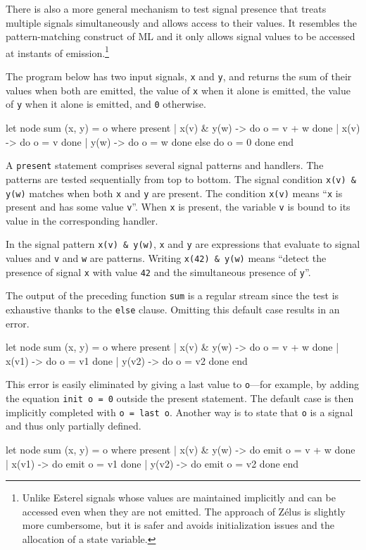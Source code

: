 \documentclass[11pt,titlepage,twoside]{report}
\makeatletter
\newcommand{\zls}[1]{{\@span{class="zelusinline"}#1}}
\newcommand{\zls}[1]{\texttt{#1}}
\renewcommand{\zls}[1]{\texttt{#1}}
\newcommand{\zelus}{{\sf Z\'elus}}
\newcommand{\esterel}{{\sf Esterel}}
\makeatother
\begin{document}
There is also a more general mechanism to test signal presence that treats 
multiple signals simultaneously and allows access to their values.
It resembles the pattern-matching construct of ML and it only allows signal 
values to be accessed at instants of emission.\footnote{Unlike \esterel{} 
signals whose values are maintained implicitly and can be accessed even when 
they are not emitted.
The approach of \zelus{} is slightly more cumbersome, but it is safer and 
avoids initialization issues and the allocation of a state variable.}

The program below has two input signals, \zls{x} and \zls{y}, and
returns the sum of their values when both are emitted, the value of \zls{x} 
when it alone is emitted, the value of \zls{y} when it alone is emitted, and 
\zls{0} otherwise.
\begin{chklisting}[withresult]
let node sum (x, y) = o where
  present
  | x(v) & y(w) -> do o = v + w done
  | x(v) -> do o = v done
  | y(w) -> do o = w done
  else do o = 0 done
  end
\end{chklisting}
A \zls{present} statement comprises several signal patterns and handlers.
The patterns are tested sequentially from top to bottom.
The signal condition \zls{x(v) \& y(w)} matches when both \zls{x} and 
\zls{y} are present.
The condition \zls{x(v)} means ``\zls{x} is present and
has some value \zls{v}''.
When \zls{x} is present, the variable \zls{v} is bound to its value in the 
corresponding handler.

In the signal pattern \zls{x(v) \& y(w)}, \zls{x} and \zls{y} are
expressions that evaluate to signal values and \zls{v} and \zls{w}
are patterns. Writing \zls{x(42) \& y(w)} means ``detect the presence of 
signal \zls{x} with value \zls{42} and the simultaneous presence of 
\zls{y}''.

The output of the preceding function \zls{sum} is a regular stream since the 
test is exhaustive thanks to the \zls{else} clause.
Omitting this default case results in an error.
\begin{chklisting}
let node sum (x, y) = o where
  present
  | x(v) & y(w) -> do o = v + w done
  | x(v1) -> do o = v1 done
  | y(v2) -> do o = v2 done
  end
\end{chklisting}
This error is easily eliminated by giving a last value to \zls{o}---for 
example, by adding the equation \zls{init o = 0} outside the present
statement. The default case is then implicitly completed with \zls{o = last 
o}.
Another way is to state that \zls{o} is a signal and thus only partially 
defined.
\begin{chklisting}[withresult]
let node sum (x, y) = o where
  present
  | x(v) & y(w) -> do emit o = v + w done
  | x(v1) -> do emit o = v1 done
  | y(v2) -> do emit o = v2 done
  end
\end{chklisting}
\end{document}
